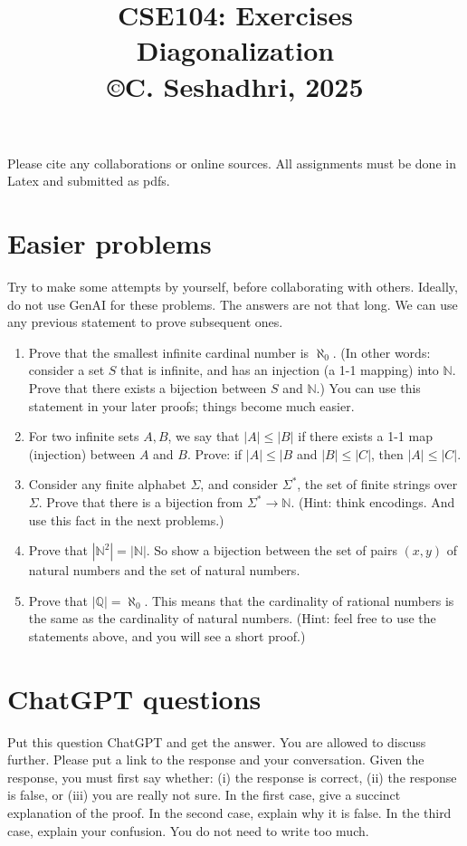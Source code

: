 \documentclass[11pt]{article}
\title{CSE104: Exercises\\Diagonalization\\{\small \copyright C. Seshadhri, 2025}}
\date{}
\theoremstyle{definition}
\newcommand{\NN}{\mathbb{N}}
\begin{document}
\maketitle

Please cite any collaborations
or online sources. All assignments must be done in Latex and submitted as pdfs.

\section{Easier problems}

Try to make some attempts by yourself, before collaborating with others. Ideally, do not use GenAI for these
problems. The answers are not that long. We can use any previous statement to prove subsequent ones.

\begin{enumerate}
    \item Prove that the smallest infinite cardinal number is $\aleph_0$. (In other words: consider a set $S$ that is infinite, and has an injection (a 1-1 mapping) into $\NN$. Prove that there exists a bijection between $S$ and $\NN$.) You can use this statement in your later proofs; things become much easier.
    \item For two infinite sets $A, B$, we say that $|A| \leq |B|$ if there exists a 1-1 map (injection) between $A$ and $B$. 
Prove: if $|A| \leq |B$ and $|B| \leq |C|$, then $|A| \leq |C|$.
    \item Consider any finite alphabet $\Sigma$, and consider $\Sigma^*$, the set of finite strings over $\Sigma$. Prove that
        there is a bijection from $\Sigma^* \to \NN$. (Hint: think encodings.
        And use this fact in the next problems.)
    \item Prove that $|\NN^2| = |\NN|$. So show a bijection between the set of pairs $(x,y)$ of natural numbers and the set of natural numbers.
    \item Prove that $|\mathbb{Q}| = \aleph_0$. This means that the cardinality of rational numbers is the same as the cardinality of natural numbers.
        (Hint: feel free to use the statements above, and you will see a short proof.)
\end{enumerate}


\section{ChatGPT questions} 

Put this question ChatGPT and get the answer. You are allowed to discuss further. Please put a link to the response and your conversation. 
Given the response, you must first say whether: (i) the response is correct, (ii) the response is false, or (iii) you are really not sure.
In the first case, give a succinct explanation of the proof. In the second case, explain why it is false.
In the third case, explain your confusion. You do not need to write too much.
\end{document}
